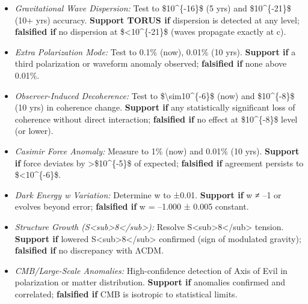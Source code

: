 \documentclass[
]{article}
\begin{document}
\begin{itemize}
\item
  \emph{Gravitational Wave Dispersion:} Test to \$10\^{}\{-16\}\$ (5
  yrs) and \$10\^{}\{-21\}\$ (10+ yrs) accuracy. \textbf{Support TORUS
  if} dispersion is detected at any level; \textbf{falsified if} no
  dispersion at \$\textless10\^{}\{-21\}\$ (waves propagate exactly at
  c)\hspace{0pt}.
\item
  \emph{Extra Polarization Mode:} Test to 0.1\% (now), 0.01\% (10 yrs).
  \textbf{Support if} a third polarization or waveform anomaly observed;
  \textbf{falsified if} none above 0.01\%\hspace{0pt}.
\item
  \emph{Observer-Induced Decoherence:} Test to
  \$\textbackslash sim10\^{}\{-6\}\$ (now) and \$10\^{}\{-8\}\$ (10 yrs)
  in coherence change. \textbf{Support if} any statistically significant
  loss of coherence without direct interaction; \textbf{falsified if} no
  effect at \$10\^{}\{-8\}\$ level (or lower)\hspace{0pt}.
\item
  \emph{Casimir Force Anomaly:} Measure to 1\% (now) and 0.01\% (10
  yrs). \textbf{Support if} force deviates by
  \textgreater\$10\^{}\{-5\}\$ of expected\hspace{0pt};
  \textbf{falsified if} agreement persists to \$\textless10\^{}\{-6\}\$.
\item
  \emph{Dark Energy w Variation:} Determine w to ±0.01. \textbf{Support
  if} w ≠ --1 or evolves beyond error; \textbf{falsified if} w = --1.000
  ± 0.005 constant\hspace{0pt}.
\item
  \emph{Structure Growth
  (S\textless sub\textgreater8\textless/sub\textgreater):} Resolve
  S\textless sub\textgreater8\textless/sub\textgreater{} tension.
  \textbf{Support if} lowered
  S\textless sub\textgreater8\textless/sub\textgreater{} confirmed (sign
  of modulated gravity)\hspace{0pt}; \textbf{falsified if} no
  discrepancy with ΛCDM.
\item
  \emph{CMB/Large-Scale Anomalies:} High-confidence detection of Axis of
  Evil in polarization or matter distribution. \textbf{Support if}
  anomalies confirmed and correlated\hspace{0pt}; \textbf{falsified if}
  CMB is isotropic to statistical limits\hspace{0pt}.
\end{itemize}
\end{document}
